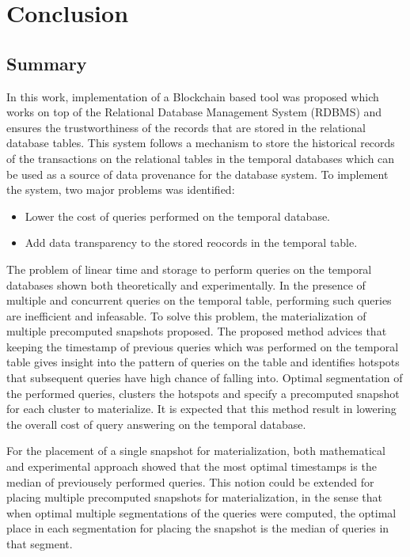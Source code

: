 \chapter{Conclusion}

	\section{Summary}
		In this work, implementation of a Blockchain based tool was proposed which works on top of the Relational Database Management System (RDBMS) and ensures the trustworthiness of the records that are stored in the relational database tables. This system follows a mechanism to store the historical records of the transactions on the relational tables in the temporal databases which can be used as a source of data provenance for the database system. To implement the system, two major problems was identified: 
		\begin{itemize}
			\item Lower the cost of queries performed on the temporal database.
			\item Add data transparency to the stored reocords in the temporal table.
		\end{itemize}

		The problem of linear time and storage to perform queries on the temporal databases shown both theoretically and experimentally. In the presence of multiple and concurrent queries on the temporal table, performing such queries are inefficient and infeasable. To solve this problem, the materialization of multiple precomputed snapshots proposed. The proposed method advices that keeping the timestamp of previous queries which was performed on the temporal table
		gives insight into the pattern of queries on the table and identifies hotspots that subsequent queries have high chance of falling into. Optimal segmentation of the performed queries, clusters the hotspots and specify a precomputed snapshot for each cluster to materialize. It is expected that this method result in lowering the overall cost of query answering on the temporal database.

		For the placement of a single snapshot for materialization, both mathematical and experimental approach showed that the most optimal timestamps is the median of previousely performed queries. This notion could be extended for placing multiple precomputed snapshots for materialization, in the sense that when optimal multiple segmentations of the queries were computed, the optimal place in each segmentation for placing the snapshot is the median of queries in that segment.

